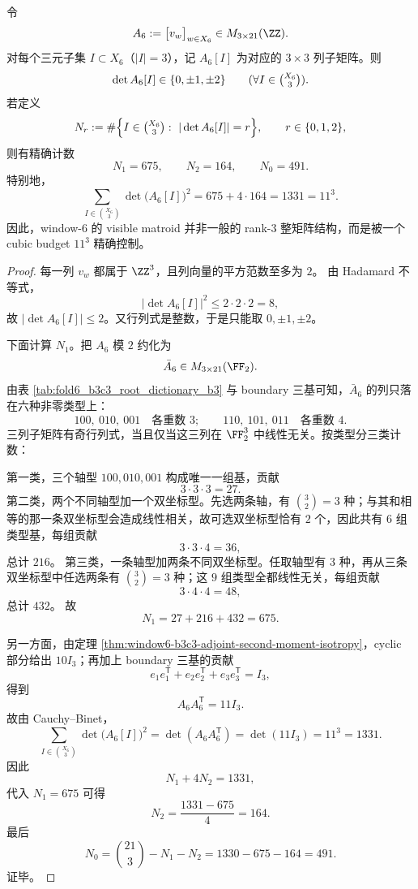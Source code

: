 \begin{theorem}\label{thm:window6-visible-matroid-minor-census}
令
\[
A_6:=\bigl[v_w\bigr]_{w\in X_6}\in M_{3\times 21}(\ZZ).
\]
对每个三元子集 \(I\subset X_6\)（\(|I|=3\)），记 \(A_6[I]\) 为对应的 \(3\times 3\) 列子矩阵。则
\[
\det A_6[I]\in\{0,\pm 1,\pm 2\}
\qquad
(\forall I\in \tbinom{X_6}{3}).
\]
若定义
\[
N_r:=
\#\Bigl\{
I\in\tbinom{X_6}{3}:\ |\det A_6[I]|=r
\Bigr\},
\qquad
r\in\{0,1,2\},
\]
则有精确计数
\[
N_1=675,
\qquad
N_2=164,
\qquad
N_0=491.
\]
特别地，
\[
\sum_{I\in\binom{X_6}{3}}\det\!\bigl(A_6[I]\bigr)^2
=
675+4\cdot 164
=
1331
=
11^3.
\]
因此，window-\(6\) 的 visible matroid 并非一般的 rank-\(3\) 整矩阵结构，而是被一个 cubic budget \(11^3\) 精确控制。
\end{theorem}
\begin{proof}
每一列 \(v_w\) 都属于 \(\ZZ^3\)，且列向量的平方范数至多为 \(2\)。
由 Hadamard 不等式，
\[
|\det A_6[I]|^2\le 2\cdot 2\cdot 2=8,
\]
故 \(|\det A_6[I]|\le 2\)。又行列式是整数，于是只能取 \(0,\pm 1,\pm 2\)。

下面计算 \(N_1\)。把 \(A_6\) 模 \(2\) 约化为
\[
\bar A_6\in M_{3\times 21}(\FF_2).
\]
由表 \ref{tab:fold6_b3c3_root_dictionary_b3} 与 boundary 三基可知，\(\bar A_6\) 的列只落在六种非零类型上：
\[
100,\ 010,\ 001
\quad\text{各重数 }3;
\qquad
110,\ 101,\ 011
\quad\text{各重数 }4.
\]
三列子矩阵有奇行列式，当且仅当这三列在 \(\FF_2^3\) 中线性无关。按类型分三类计数：

第一类，三个轴型 \(100,010,001\) 构成唯一一组基，贡献
\[
3\cdot 3\cdot 3=27.
\]
第二类，两个不同轴型加一个双坐标型。先选两条轴，有 \(\binom 32=3\) 种；与其和相等的那一条双坐标型会造成线性相关，故可选双坐标型恰有 \(2\) 个，因此共有 \(6\) 组类型基，每组贡献
\[
3\cdot 3\cdot 4=36,
\]
总计 \(216\)。
第三类，一条轴型加两条不同双坐标型。任取轴型有 \(3\) 种，再从三条双坐标型中任选两条有 \(\binom 32=3\) 种；这 \(9\) 组类型全都线性无关，每组贡献
\[
3\cdot 4\cdot 4=48,
\]
总计 \(432\)。
故
\[
N_1=27+216+432=675.
\]

另一方面，由定理 \ref{thm:window6-b3c3-adjoint-second-moment-isotropy}，cyclic 部分给出 \(10I_3\)；再加上 boundary 三基的贡献
\[
e_1e_1^{\mathsf T}+e_2e_2^{\mathsf T}+e_3e_3^{\mathsf T}=I_3,
\]
得到
\[
A_6A_6^{\mathsf T}=11I_3.
\]
故由 Cauchy--Binet，
\[
\sum_{I\in\binom{X_6}{3}}\det\!\bigl(A_6[I]\bigr)^2
=
\det(A_6A_6^{\mathsf T})
=
\det(11I_3)
=
11^3
=
1331.
\]
因此
\[
N_1+4N_2=1331,
\]
代入 \(N_1=675\) 可得
\[
N_2=\frac{1331-675}{4}=164.
\]
最后
\[
N_0=\binom{21}{3}-N_1-N_2
=
1330-675-164
=
491.
\]
证毕。
\end{proof}

